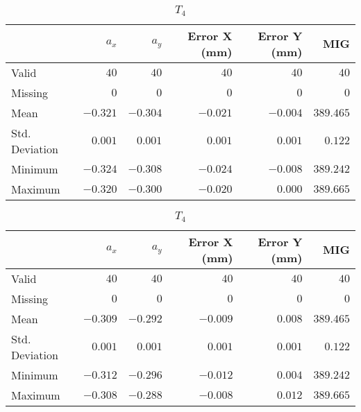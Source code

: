 \begin{table}[h]
    \vspace{10pt} %
    
    \begin{subtable}{\textwidth}
        \centering
        \footnotesize
        \begin{tabular}{lrrrrr}
            \toprule
                & $a_x$ & $a_y$ & Error X (mm) & Error Y (mm) & MIG  \\
            \midrule
            Valid & $40$ & $40$ & $40$ & $40$ & $40$  \\
			Missing & $0$ & $0$ & $0$ & $0$ & $0$  \\
			Mean & $-0.321$ & $-0.304$ & $-0.021$ & $-0.004$ & $389.465$  \\
			Std. Deviation & $0.001$ & $0.001$ & $0.001$ & $0.001$ & $0.122$  \\
			Minimum & $-0.324$ & $-0.308$ & $-0.024$ & $-0.008$ & $389.242$  \\
			Maximum & $-0.320$ & $-0.300$ & $-0.020$ & $0.000$ & $389.665$  \\
            \bottomrule
        \end{tabular}
        \caption{$T_3$}
    \end{subtable}

    \vspace{10pt}

    \begin{subtable}{\textwidth}
    \centering
    \footnotesize
    \begin{tabular}{lrrrrr}
        \toprule
            & $a_x$ & $a_y$ & Error X (mm) & Error Y (mm) & MIG  \\
        \midrule
        Valid & $40$ & $40$ & $40$ & $40$ & $40$  \\
        Missing & $0$ & $0$ & $0$ & $0$ & $0$  \\
        Mean & $-0.309$ & $-0.292$ & $-0.009$ & $0.008$ & $389.465$  \\
        Std. Deviation & $0.001$ & $0.001$ & $0.001$ & $0.001$ & $0.122$  \\
        Minimum & $-0.312$ & $-0.296$ & $-0.012$ & $0.004$ & $389.242$  \\
        Maximum & $-0.308$ & $-0.288$ & $-0.008$ & $0.012$ & $389.665$  \\
        \bottomrule
    \end{tabular}
    \caption{$T_4$}
    \end{subtable}

    \vspace{10pt}


\end{table}
